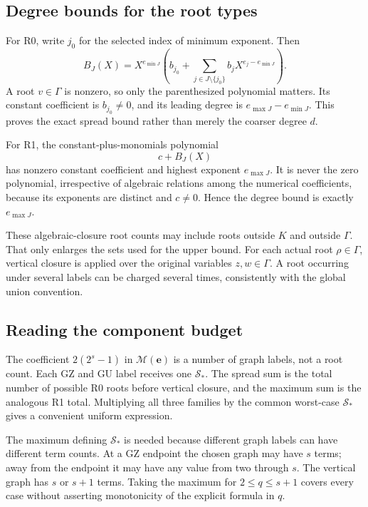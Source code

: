\documentclass[11pt]{article}
\theoremstyle{definition}
\newcommand{\Scal}{\mathcal S}
\newcommand{\Mcal}{\mathcal M}
\newcommand{\ee}{\mathbf e}
\begin{document}
\subsection{Degree bounds for the root types}

For R0, write \(j_0\) for the selected index of minimum exponent. Then
\[
 B_J(X)=X^{e_{\min J}}
 \left(b_{j_0}+\sum_{j\in J\setminus\{j_0\}}
 b_jX^{e_j-e_{\min J}}\right).
\]
A root \(v\in\Gamma\) is nonzero, so only the parenthesized polynomial matters. Its constant coefficient is \(b_{j_0}\neq0\), and its leading degree is \(e_{\max J}-e_{\min J}\). This proves the exact spread bound rather than merely the coarser degree \(d\).

For R1, the constant-plus-monomials polynomial
\[
 c+B_J(X)
\]
has nonzero constant coefficient and highest exponent \(e_{\max J}\). It is never the zero polynomial, irrespective of algebraic relations among the numerical coefficients, because its exponents are distinct and \(c\neq0\). Hence the degree bound is exactly \(e_{\max J}\).

These algebraic-closure root counts may include roots outside \(K\) and outside \(\Gamma\). That only enlarges the sets used for the upper bound. For each actual root \(\rho\in\Gamma\), vertical closure is applied over the original variables \(z,w\in\Gamma\). A root occurring under several labels can be charged several times, consistently with the global union convention.

\subsection{Reading the component budget}

The coefficient \(2(2^s-1)\) in \(\Mcal(\ee)\) is a number of graph labels, not a root count. Each GZ and GU label receives one \(\Scal_*\). The spread sum is the total number of possible R0 roots before vertical closure, and the maximum sum is the analogous R1 total. Multiplying all three families by the common worst-case \(\Scal_*\) gives a convenient uniform expression.

The maximum defining \(\Scal_*\) is needed because different graph labels can have different term counts. At a GZ endpoint the chosen graph may have \(s\) terms; away from the endpoint it may have any value from two through \(s\). The vertical graph has \(s\) or \(s+1\) terms. Taking the maximum for \(2\leq q\leq s+1\) covers every case without asserting monotonicity of the explicit formula in \(q\).
\end{document}

